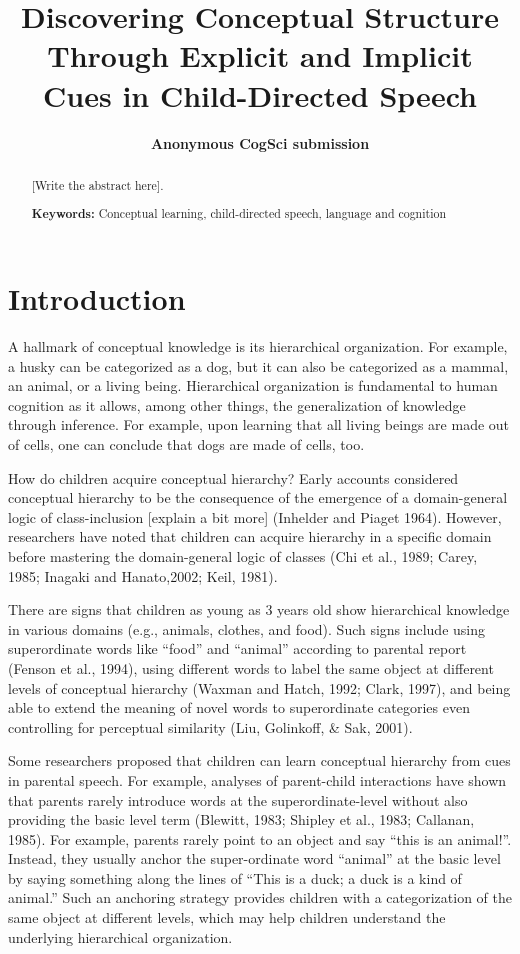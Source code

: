 \documentclass[10pt, letterpaper]{article}
\title{Discovering Conceptual Structure Through Explicit and Implicit Cues in
Child-Directed Speech}
\author{{\large \bf Anonymous CogSci submission}}
\begin{document}
\maketitle

\begin{abstract}
{[}Write the abstract here{]}.

\textbf{Keywords:}
Conceptual learning, child-directed speech, language and cognition
\end{abstract}

\hypertarget{introduction}{%
\section{Introduction}\label{introduction}}

A hallmark of conceptual knowledge is its hierarchical organization. For
example, a husky can be categorized as a dog, but it can also be
categorized as a mammal, an animal, or a living being. Hierarchical
organization is fundamental to human cognition as it allows, among other
things, the generalization of knowledge through inference. For example,
upon learning that all living beings are made out of cells, one can
conclude that dogs are made of cells, too.

How do children acquire conceptual hierarchy? Early accounts considered
conceptual hierarchy to be the consequence of the emergence of a
domain-general logic of class-inclusion {[}explain a bit more{]}
(Inhelder and Piaget 1964). However, researchers have noted that
children can acquire hierarchy in a specific domain before mastering the
domain-general logic of classes (Chi et al., 1989; Carey, 1985; Inagaki
and Hanato,2002; Keil, 1981).

There are signs that children as young as 3 years old show hierarchical
knowledge in various domains (e.g., animals, clothes, and food). Such
signs include using superordinate words like ``food'' and ``animal''
according to parental report (Fenson et al., 1994), using different
words to label the same object at different levels of conceptual
hierarchy (Waxman and Hatch, 1992; Clark, 1997), and being able to
extend the meaning of novel words to superordinate categories even
controlling for perceptual similarity (Liu, Golinkoff, \& Sak, 2001).

Some researchers proposed that children can learn conceptual hierarchy
from cues in parental speech. For example, analyses of parent-child
interactions have shown that parents rarely introduce words at the
superordinate-level without also providing the basic level term
(Blewitt, 1983; Shipley et al., 1983; Callanan, 1985). For example,
parents rarely point to an object and say ``this is an animal!''.
Instead, they usually anchor the super-ordinate word ``animal'' at the
basic level by saying something along the lines of ``This is a duck; a
duck is a kind of animal.'' Such an anchoring strategy provides children
with a categorization of the same object at different levels, which may
help children understand the underlying hierarchical organization.
\end{document}

